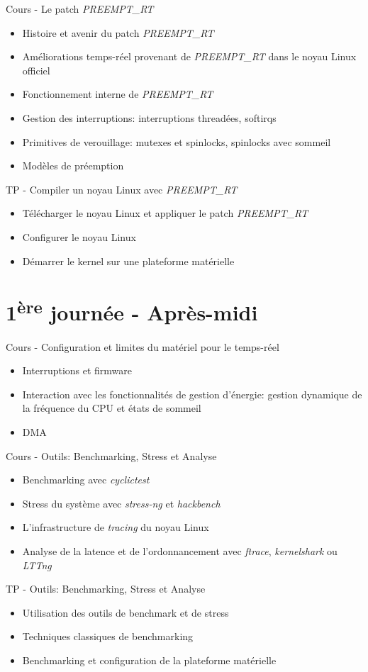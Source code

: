 \documentclass[a4paper,12pt,obeyspaces,spaces,hyphens]{article}
\begin{document}
\feagendatwocolumn
{Cours - Le patch {\em PREEMPT\_RT}}
{
  \begin{itemize}
  \item Histoire et avenir du patch {\em PREEMPT\_RT}
  \item Améliorations temps-réel provenant de {\em PREEMPT\_RT} dans le noyau Linux officiel
  \item Fonctionnement interne de {\em PREEMPT\_RT}
  \item Gestion des interruptions: interruptions threadées, softirqs
  \item Primitives de verouillage: mutexes et spinlocks, spinlocks avec sommeil
  \item Modèles de préemption
  \end{itemize}
}
{TP - Compiler un noyau Linux avec {\em PREEMPT\_RT}}
{
  \begin{itemize}
  \item Télécharger le noyau Linux et appliquer le patch {\em PREEMPT\_RT}
  \item Configurer le noyau Linux
  \item Démarrer le kernel sur une plateforme matérielle
 \end{itemize}
}

\section{1\textsuperscript{ère} journée - Après-midi}

\feagendaonecolumn
{Cours - Configuration et limites du matériel pour le temps-réel}
{
  \begin{itemize}
  \item Interruptions et firmware
  \item Interaction avec les fonctionnalités de gestion d'énergie:
    gestion dynamique de la fréquence du CPU et états de sommeil
  \item DMA
  \end{itemize}
}

\feagendatwocolumn
{Cours - Outils: Benchmarking, Stress et Analyse}
{
  \begin{itemize}
  \item Benchmarking avec {\em cyclictest}
  \item Stress du système avec {\em stress-ng} et {\em hackbench}
  \item L'infrastructure de {\em tracing} du noyau Linux
  \item Analyse de la latence et de l'ordonnancement avec {\em
      ftrace}, {\em kernelshark} ou {\em LTTng}
  \end{itemize}
}
{TP - Outils: Benchmarking, Stress et Analyse}
{
  \begin{itemize}
  \item Utilisation des outils de benchmark et de stress
  \item Techniques classiques de benchmarking
  \item Benchmarking et configuration de la plateforme matérielle
  \end{itemize}
}
\end{document}
